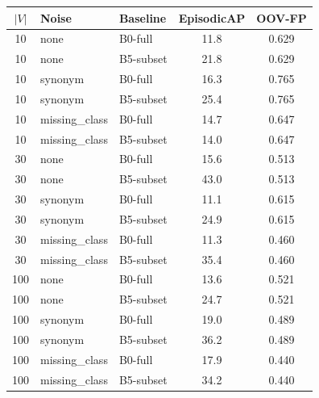 \begin{tabular}{c l l cc}
\toprule
$|V|$ & Noise & Baseline & EpisodicAP & OOV-FP \\
\midrule
10 & none & B0-full & 11.8 & 0.629 \\
10 & none & B5-subset & 21.8 & 0.629 \\
10 & synonym & B0-full & 16.3 & 0.765 \\
10 & synonym & B5-subset & 25.4 & 0.765 \\
10 & missing\_class & B0-full & 14.7 & 0.647 \\
10 & missing\_class & B5-subset & 14.0 & 0.647 \\
30 & none & B0-full & 15.6 & 0.513 \\
30 & none & B5-subset & 43.0 & 0.513 \\
30 & synonym & B0-full & 11.1 & 0.615 \\
30 & synonym & B5-subset & 24.9 & 0.615 \\
30 & missing\_class & B0-full & 11.3 & 0.460 \\
30 & missing\_class & B5-subset & 35.4 & 0.460 \\
100 & none & B0-full & 13.6 & 0.521 \\
100 & none & B5-subset & 24.7 & 0.521 \\
100 & synonym & B0-full & 19.0 & 0.489 \\
100 & synonym & B5-subset & 36.2 & 0.489 \\
100 & missing\_class & B0-full & 17.9 & 0.440 \\
100 & missing\_class & B5-subset & 34.2 & 0.440 \\
\bottomrule
\end{tabular}
